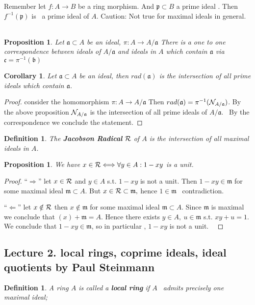 \documentclass[11pt]{article}
\newtheorem{prop}[thm]{Proposition}
\newtheorem{cor}[thm]{Corollary}
\newtheorem{dfn}[thm]{Definition}
\newcommand{\sca}{{\mathfrak a}}
\newcommand{\scb}{{\mathfrak b}}
\newcommand{\scc}{{\mathfrak c}}
\newcommand{\scm}{{\mathfrak m}}
\newcommand{\scp}{{\mathfrak p}}
\newcommand{\caln}{{\cal N}}
\newcommand{\calr}{{\cal R}}
\begin{document}
Remember let $f:A \rightarrow B$ be a ring morphism. And $\scp\subset B$ a prime ideal . 
Then $f^{-1}(\scp)$ is  a prime ideal of $A$.
Caution: Not true for maximal ideals in general. 
 
\begin{prop}
Let $\sca\subset A$ be an ideal, $\pi : A\rightarrow A/\sca$
There is a one to one correspondence between ideals of $A/\sca$ and ideals in $A$ which contain
$\sca$ via $\scc=\pi^{-1}(\scb)$
\end{prop}

\begin{cor}
Let $\sca\subset  A $ be an ideal, then $rad(\sca)$ is the intersection of all prime ideals which contain $\sca$.
\end{cor}
\begin{proof}
consider the homomorphism $\pi :A\rightarrow A/\sca$
Then $rad(\sca)=\pi^{-1}(\caln_{A/\sca})$.
By the above proposition $\caln_{A/\sca}$ is the intersection of all prime ideals of $A/\sca$.
 By the correspondence we conclude the statement.
\end{proof}
\begin{dfn}
 The \textbf{Jacobson Radical} $\calr$ of $A$ is the intersection of all maximal ideals in $A$.
\end{dfn}
\begin{prop}\label{prop:criterion_jacobson_radical}
We have 
$x\in \calr\Longleftrightarrow \forall y \in A: 1-xy $ is a unit.
\end{prop}
\begin{proof}
``$\Longrightarrow$'' let $x\in \calr$ and $y\in A$ s.t. $1-xy$ is not a unit. Then $1-xy\in \scm$ for some maximal ideal 
$\scm \subset A$. But $x\in \calr\subset \scm,$ hence $1\in \scm$  contradiction.

``$\Longleftarrow$'' let $x  \notin \calr$ then $x \notin \scm$ for some maximal ideal $\scm\subset A$.
Since $\scm$ is maximal we conclude that $(x)+\scm=A$. Hence there exists $y\in A,\   u\in \scm$ s.t. $xy+u=1$.
We conclude that $1-xy \in \scm $, so in particular , $1-xy$ is not a unit.
 \end{proof}
\subsection{Lecture 2. local rings, coprime ideals, ideal quotients by Paul Steinmann}
\begin{dfn}
A ring $A$ is called a \textbf{local ring} if $A$  admits precisely one maximal ideal;
\end{dfn}
\end{document}
